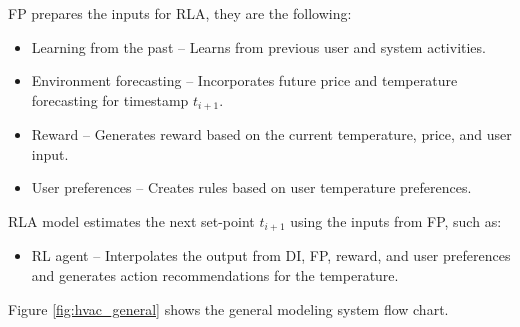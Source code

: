 FP prepares the inputs for RLA, they are the following:
\begin{itemize}
    \item Learning from the past -- Learns from previous user and system activities.
    \item Environment forecasting -- Incorporates future price and temperature forecasting for timestamp ${t_{i+1}}$.
    \item Reward -- Generates reward based on the current temperature, price, and user input.
    \item User preferences -- Creates rules based on user temperature preferences.
\end{itemize}

RLA model estimates the next set-point ${t_{i+1}}$ using the inputs from FP, such as: 
\begin{itemize}
    \item RL agent --  Interpolates the output from DI, FP, reward, and user preferences and generates action recommendations for the temperature.
\end{itemize}

Figure \ref{fig:hvac_general} shows the general modeling system flow chart. 






